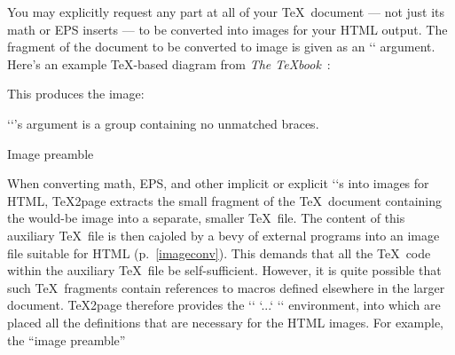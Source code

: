 %
%
You may explicitly request any part at all of your \TeX\
document — not just its math or EPS inserts —
to be converted into images for your HTML output.  The
fragment of the document to be converted to image is
given as an `\makehtmlimage` argument.
Here’s an example \TeX-based diagram from {\em
The \TeX book}~\cite[p.~389]{texbook}:



\n This produces the  image:

\smallskip

\smallskip

\n `\makehtmlimage`’s argument is a group containing
no unmatched braces.

\beginsection Image preamble

%
When converting math, EPS, and other implicit or
explicit `\htmlimage`s into images for HTML, \TeX2page
extracts the small fragment of the \TeX\ document
containing the would-be image into a separate, smaller
\TeX\ file.  The content of this auxiliary \TeX\ file is
then cajoled by a bevy of external programs into
an image file suitable for HTML (p.~\ref{imageconv}).  This demands that
all the \TeX\ code within the auxiliary \TeX\ file be
self-sufficient.  However, it is quite possible that
such \TeX\ fragments contain references to macros
defined elsewhere in the larger document.
\TeX2page therefore provides the `\imgpreamble`
`...` `\endimgpreamble` environment, into which
are placed all the definitions that are necessary for
the HTML images.   For example, the “image preamble”

